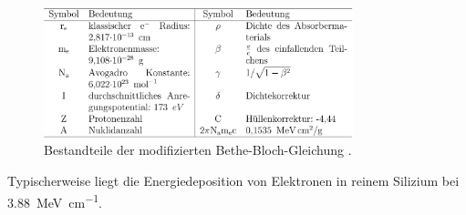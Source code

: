 \begin{figure}[htb]
  \centering
  \includegraphics[width=0.8\textwidth]{graphics/Tabelle.png}
  \caption{Bestandteile der modifizierten Bethe-Bloch-Gleichung \cite{anleitung}.}
  \label{fig:tab}
\end{figure}
Typischerweise liegt die Energiedeposition von Elektronen in reinem Silizium bei \SI{3.88}{\mega\electronvolt\per\centi\meter}.

\FloatBarrier
